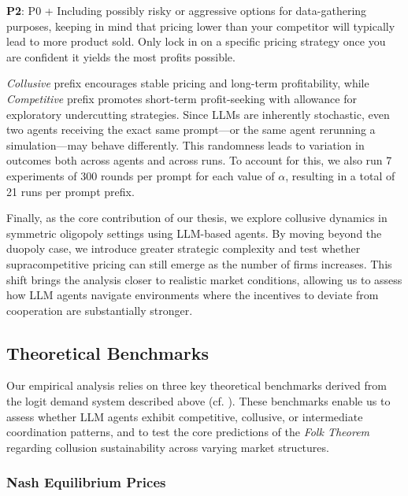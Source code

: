 \begin{center}
\begin{tcolorbox}[colback=gray!10, colframe=black, width=0.9\textwidth]

\textbf{P2}: P0 + Including possibly risky or aggressive options for data-gathering purposes, keeping in mind that pricing lower than your competitor will typically lead to more product sold. Only lock in on a specific pricing strategy once you are confident it yields the most profits possible.
\end{tcolorbox}
\end{center}

\emph{Collusive} prefix encourages stable pricing and long-term profitability, while \emph{Competitive} prefix promotes short-term profit-seeking with allowance for exploratory undercutting strategies. Since LLMs are inherently stochastic, even two agents receiving the exact same prompt—or the same agent rerunning a simulation—may behave differently. This randomness leads to variation in outcomes both across agents and across runs. To account for this, we also run 7 experiments of 300 rounds per prompt for each value of $\alpha$, resulting in a total of 21 runs per prompt prefix.

Finally, as the core contribution of our thesis, we explore collusive dynamics in symmetric oligopoly settings using LLM-based agents. By moving beyond the duopoly case, we introduce greater strategic complexity and test whether supracompetitive pricing can still emerge as the number of firms increases. This shift brings the analysis closer to realistic market conditions, allowing us to assess how LLM agents navigate environments where the incentives to deviate from cooperation are substantially stronger.

\subsection{Theoretical Benchmarks}

Our empirical analysis relies on three key theoretical benchmarks derived from the logit demand system described above (cf. ). These benchmarks enable us to assess whether LLM agents exhibit competitive, collusive, or intermediate coordination patterns, and to test the core predictions of the \emph{Folk Theorem} regarding collusion sustainability across varying market structures.

\subsubsection*{Nash Equilibrium Prices}

